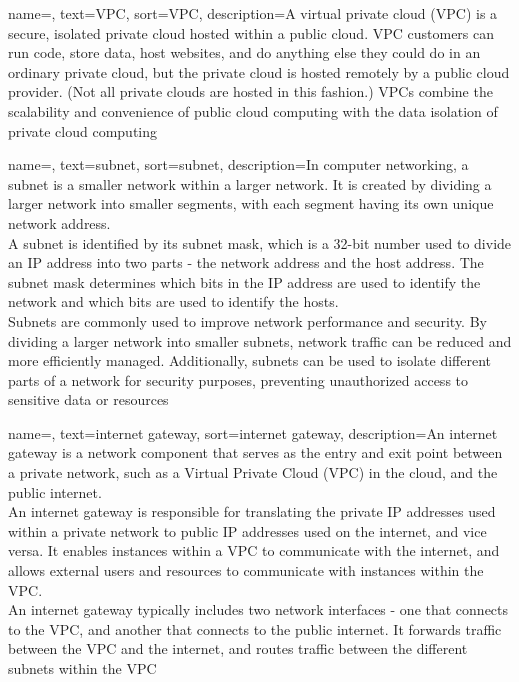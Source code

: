 {
    name=,
    text=VPC,
    sort=VPC,
    description={A virtual private cloud (VPC) is a secure, isolated private cloud hosted within a public cloud. VPC customers can run code, store data, host websites, and do anything else they could do in an ordinary private cloud, but the private cloud is hosted remotely by a public cloud provider. (Not all private clouds are hosted in this fashion.) VPCs combine the scalability and convenience of public cloud computing with the data isolation of private cloud computing}
}

{
    name=,
    text=subnet,
    sort=subnet,
    description={In computer networking, a subnet is a smaller network within a larger network. It is created by dividing a larger network into smaller segments, with each segment having its own unique network address.\\
    A subnet is identified by its subnet mask, which is a 32-bit number used to divide an IP address into two parts - the network address and the host address. The subnet mask determines which bits in the IP address are used to identify the network and which bits are used to identify the hosts.\\
    Subnets are commonly used to improve network performance and security. By dividing a larger network into smaller subnets, network traffic can be reduced and more efficiently managed. Additionally, subnets can be used to isolate different parts of a network for security purposes, preventing unauthorized access to sensitive data or resources}
}

{
    name=,
    text=internet gateway,
    sort=internet gateway,
    description={An internet gateway is a network component that serves as the entry and exit point between a private network, such as a Virtual Private Cloud (VPC) in the cloud, and the public internet.\\
    An internet gateway is responsible for translating the private IP addresses used within a private network to public IP addresses used on the internet, and vice versa. It enables instances within a VPC to communicate with the internet, and allows external users and resources to communicate with instances within the VPC.\\    
    An internet gateway typically includes two network interfaces - one that connects to the VPC, and another that connects to the public internet. It forwards traffic between the VPC and the internet, and routes traffic between the different subnets within the VPC}
}

